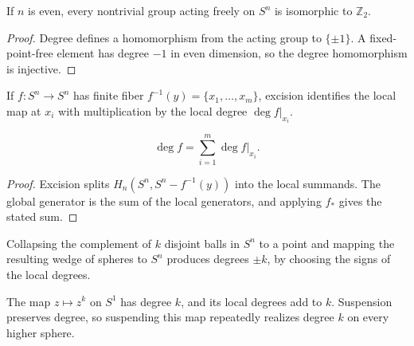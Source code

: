 \begin{proposition}
\label{prop:z2-acts-freely-even-spheres}

If $n$ is even, every nontrivial group acting freely on $S^n$ is isomorphic to $\mathbb{Z}_2$.
\end{proposition}
\begin{proof}
\sketch Degree defines a homomorphism from the acting group to $\{\pm1\}$.  A fixed-point-free element has degree $-1$ in even dimension, so the degree homomorphism is injective.
\end{proof}

If $f:S^n\to S^n$ has finite fiber $f^{-1}(y)=\{x_1,\ldots,x_m\}$, excision identifies the local map at $x_i$ with multiplication by the local degree $\deg f|_{x_i}$.

\begin{proposition}
\label{prop:local-degree-formula}

\[
\deg f=\sum_{i=1}^m\deg f|_{x_i}.
\]
\end{proposition}
\begin{proof}
\sketch Excision splits $H_n(S^n,S^n-f^{-1}(y))$ into the local summands.  The global generator is the sum of the local generators, and applying $f_*$ gives the stated sum.
\end{proof}

\begin{example}
\label{ex:degree-reflection-antipodal}

Collapsing the complement of $k$ disjoint balls in $S^n$ to a point and mapping the resulting wedge of spheres to $S^n$ produces degrees $\pm k$, by choosing the signs of the local degrees.
\end{example}

\begin{example}
\label{ex:degree-suspension}

The map $z\mapsto z^k$ on $S^1$ has degree $k$, and its local degrees add to $k$.  Suspension preserves degree, so suspending this map repeatedly realizes degree $k$ on every higher sphere.
\end{example}

